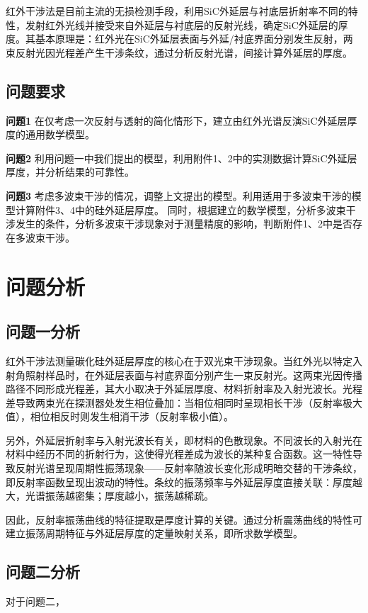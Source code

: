 \documentclass{cumcmthesis}
\begin{document}
红外干涉法是目前主流的无损检测手段，利用SiC外延层与衬底层折射率不同的特性，发射红外光线并接受来自外延层与衬底层的反射光线，确定SiC外延层的厚度。其基本原理是：红外光在SiC外延层表面与外延/衬底界面分别发生反射，两束反射光因光程差产生干涉条纹，通过分析反射光谱，间接计算外延层的厚度。

\subsection{问题要求}

\textbf{问题1}  
在仅考虑一次反射与透射的简化情形下，建立由红外光谱反演SiC外延层厚度的通用数学模型。

\textbf{问题2}  
利用问题一中我们提出的模型，利用附件1、2中的实测数据计算SiC外延层厚度，并分析结果的可靠性。

\textbf{问题3} 
考虑多波束干涉的情况，调整上文提出的模型。利用适用于多波束干涉的模型计算附件3、4中的硅外延层厚度。
同时，根据建立的数学模型，分析多波束干涉发生的条件，分析多波束干涉现象对于测量精度的影响，判断附件1、2中是否存在多波束干涉。

\section{问题分析}
\subsection{问题一分析}
红外干涉法测量碳化硅外延层厚度的核心在于双光束干涉现象。当红外光以特定入射角照射样品时，在外延层表面与衬底界面分别产生一束反射光。这两束光因传播路径不同形成光程差，其大小取决于外延层厚度、材料折射率及入射光波长。光程差导致两束光在探测器处发生相位叠加：当相位相同时呈现相长干涉（反射率极大值），相位相反时则发生相消干涉（反射率极小值）。

另外，外延层折射率与入射光波长有关，即材料的色散现象。不同波长的入射光在材料中经历不同的折射行为，这使得光程差成为波长的某种复合函数。这一特性导致反射光谱呈现周期性振荡现象——反射率随波长变化形成明暗交替的干涉条纹，即反射率函数呈现出波动的特性。条纹的振荡频率与外延层厚度直接关联：厚度越大，光谱振荡越密集；厚度越小，振荡越稀疏。

因此，反射率振荡曲线的特征提取是厚度计算的关键。通过分析震荡曲线的特性可建立振荡周期特征与外延层厚度的定量映射关系，即所求数学模型。

\subsection{问题二分析}	
对于问题二，
\end{document}
